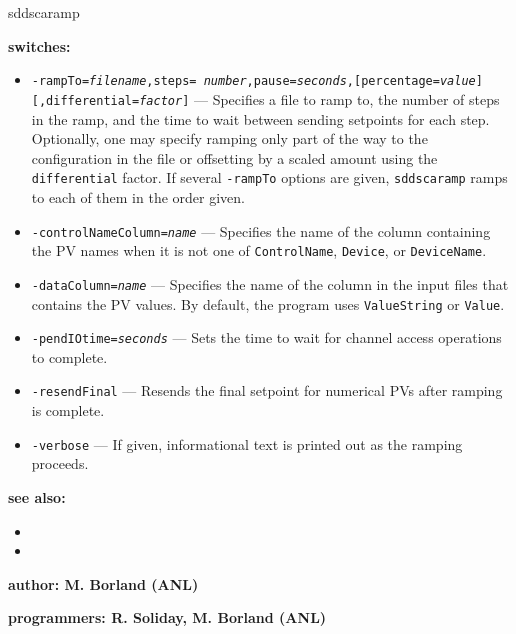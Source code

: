\begin{sddsprog}{sddscaramp}
\item {\bf switches:}
    \begin{itemize}
        \item {\tt -rampTo={\em filename},steps={\em
        number},pause={\em seconds},[percentage={\em value}][,differential={\em factor}]} ---
        Specifies a file to ramp to, the number of steps in the ramp,
        and the time to wait between sending setpoints for each step.
        Optionally, one may specify ramping only part of the way to
        the configuration in the file or offsetting by a scaled
        amount using the {\tt differential} factor.  If several
        {\tt -rampTo} options are given, {\tt sddscaramp} ramps to each
        of them in the order given.
        \item {\tt -controlNameColumn={\em name}} --- Specifies the
        name of the column containing the PV names when it is not
        one of {\tt ControlName}, {\tt Device}, or {\tt DeviceName}.
        \item {\tt -dataColumn={\em name}} --- Specifies the name of
        the column in the input files that contains the PV values.
        By default, the program uses {\tt ValueString} or {\tt Value}.
        \item {\tt -pendIOtime={\em seconds}} --- Sets the time to
        wait for channel access operations to complete.
        \item {\tt -resendFinal} --- Resends the final setpoint for
        numerical PVs after ramping is complete.
        \item {\tt -verbose} --- If given, informational text is
        printed out as the ramping proceeds.
      \end{itemize}

\item {\bf see also:}
    \begin{itemize}
    \item {}
    \item {}
    \end{itemize}
\item {\bf author: M. Borland (ANL)}
\item {\bf programmers: R. Soliday, M. Borland (ANL)}
\end{sddsprog}
